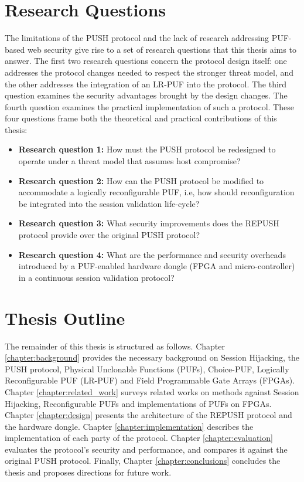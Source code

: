 \section{Research Questions}
The limitations of the PUSH protocol and the lack of research addressing PUF-based web security give rise to a set of research questions that this thesis aims to answer. The first two research questions concern the protocol design itself: one addresses the protocol changes needed to respect the stronger threat model, and the other addresses the integration of an LR-PUF into the protocol. The third question examines the security advantages brought by the design changes. The fourth question examines the practical implementation of such a protocol. These four questions frame both the theoretical and practical contributions of this thesis:
\begin{itemize}
    \item \textbf{Research question 1:} How must the PUSH protocol be redesigned to operate under a threat model that assumes host compromise?
    \item \textbf{Research question 2:} How can the PUSH protocol be modified to accommodate a logically reconfigurable PUF, i.e, how should reconfiguration be integrated into the session validation life-cycle?
    \item \textbf{Research question 3:} What security improvements does the REPUSH protocol provide over the original PUSH protocol?
    \item \textbf{Research question 4:} What are the performance and security overheads introduced by a PUF-enabled hardware dongle (FPGA and micro-controller) in a continuous session validation protocol?
\end{itemize}

\section{Thesis Outline}
The remainder of this thesis is structured as follows. Chapter \ref{chapter:background} provides the necessary background on Session Hijacking, the PUSH protocol, Physical Unclonable Functions (PUFs), Choice-PUF, Logically Reconfigurable PUF (LR-PUF) and Field Programmable Gate Arrays (FPGAs). Chapter \ref{chapter:related_work} surveys related works on methods against Session Hijacking, Reconfigurable PUFs and implementations of PUFs on FPGAs. Chapter \ref{chapter:design} presents the architecture of the REPUSH protocol and the hardware dongle. Chapter \ref{chapter:implementation} describes the implementation of each party of the protocol. Chapter \ref{chapter:evaluation} evaluates the protocol's security and performance, and compares it against the original PUSH protocol. Finally, Chapter \ref{chapter:conclusions} concludes the thesis and proposes directions for future work.




